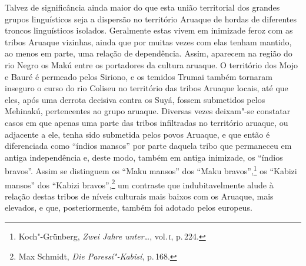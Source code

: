 Talvez de significância ainda maior do que esta união territorial dos
grandes grupos linguísticos seja a dispersão no território Aruaque de
hordas de diferentes troncos linguísticos isolados. Geralmente estas
vivem em inimizade feroz com as tribos Aruaque vizinhas, ainda que por muitas
vezes com elas tenham mantido, ao menos em parte, uma relação de
dependência. Assim, aparecem na região do rio Negro os Makú
entre os portadores da cultura aruaque. O território dos Mojo e Bauré é
permeado pelos Siriono, e os temidos Trumai também tornaram inseguro o
curso do rio Coliseu no território das tribos Aruaque locais, até que
eles, após uma derrota decisiva contra os Suyá, fossem submetidos pelos
Mehinakú, pertencentes ao grupo aruaque. Diversas vezes deixam"-se
constatar casos em que apenas uma parte das tribos infiltradas no
território aruaque, ou adjacente a ele, tenha sido submetida pelos povos Aruaque, e
que então é diferenciada como ``índios mansos'' por parte daquela tribo
que permaneceu em antiga independência e, deste modo, também em antiga
inimizade, os ``índios bravos''. Assim se distinguem os ``Maku mansos''
dos ``Maku bravos'',\footnote{Koch"-Grünberg, \textit{Zwei Jahre unter\ldots}, vol.\,\textsc{i}, p.\,224.} os ``Kabizi mansos'' dos ``Kabizi
bravos'',\footnote{Max Schmidt, \textit{Die Paressí"-Kabisí}, p.\,168.}
um contraste que indubitavelmente alude à relação destas tribos de
níveis culturais mais baixos com os Aruaque, mais elevados, e que, posteriormente, 
também foi adotado pelos europeus.

